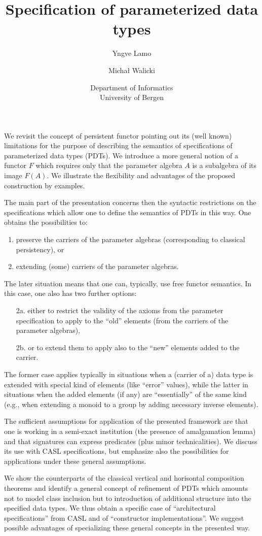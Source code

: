 \documentclass{article}
\title{Specification of parameterized data types}
\author{Yngve Lamo \and Micha{\l} Walicki}
\date{Department of Informatics\\ University of Bergen}
\begin{document}
\maketitle

We revisit the concept of persistent functor pointing out its (well known)
limitations for the purpose of describing the semantics of specifications of
parameterized data types (PDTs). We introduce a more general notion of a
functor $F$ which requires only that the parameter algebra $A$ is a subalgebra of
its image $F(A)$. We illustrate the flexibility and advantages of the proposed
construction by examples.  

The main part of the presentation concerns then the syntactic restrictions on
the specifications which allow one to define the semantics of PDTs in this
way. One obtains the possibilities to: 
\begin{enumerate}
\item preserve the carriers of the parameter algebras (corresponding to
classical persistency), or
\item extending (some) carriers of the parameter algebras.
\end{enumerate}   
The later situation means that one can, typically, use free functor
semantics. In this case, one also has two further options:
\begin{itemize}
\item[2a.] either to restrict the validity of the axioms from the parameter
specification to apply to the ``old'' elements (from the carriers of the
parameter algebras),
\item[2b.] or to extend them to apply also to the ``new'' elements added to
the carrier.
\end{itemize}
The former case applies typically in situations when  a (carrier of a) data type is extended
with special kind of elements (like ``error'' values), while the latter in
situations when the added elements (if any) are ``essentially'' of the same
kind (e.g., when extending a monoid to a group by adding necessary inverse
elements).

The sufficient assumptions for application of the presented framework are that one is working in a
semi-exact institution (the presence of amalgamation lemma) and that
signatures can express predicates (plus minor technicalities). We discuss its use with CASL
specifications, but emphasize also the possibilities for applications under
these general assumptions.

We show the counterparts of the classical vertical and horisontal composition
theorems and identify a general concept of refinement of PDTs which amounts not to
model class inclusion but to introduction of additional structure into the
specified data types. We thus obtain a specific case of ``architectural
specifications'' from CASL and of ``constructor implementations''.
We suggest possible advantages of specializing
these  general concepts in the presented way.
\end{document}
